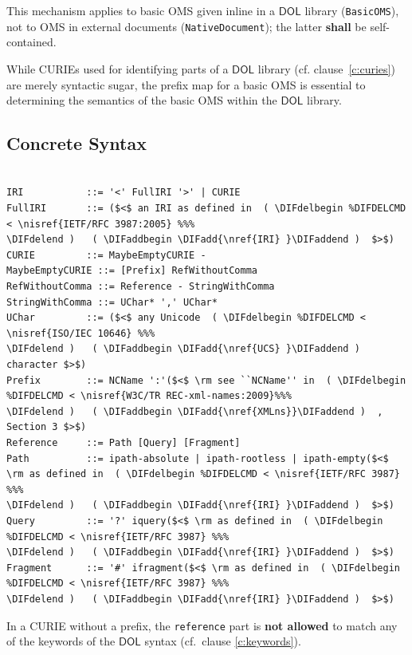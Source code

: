 \documentclass[10pt,fleqn,final]{scrreprt}
\makeatletter
\newcommand*{\cf}{cf.\@\xspace}
\newcommand*{\syntax}[1]{\texttt{#1}}
\newcommand*{\notallowed}{\textbf{not allowed}\xspace}
\newcommand*{\shall}{\textbf{shall}\xspace}
\newcommand*{\DOL}{\ensuremath{\mathsf{DOL}}\xspace}
\newcommand{\clauserefname}{clause}
\newcommand{\noterefname}{note}
\newcommand{\cref}[1]{\clauserefname~\ref{#1}}
\newcommand{\nref}[1]{\noterefname~\ref{#1}}
\newcommand{\ssclause}[1]{\subsection{#1}}
\renewcommand{\nref}[1]{\ref{nref-#1}} %
\providecommand{\DIFadd}[1]{{\protect\color{blue}\uwave{#1}}} %
\providecommand{\DIFaddbegin}{} %
\providecommand{\DIFaddend}{} %
\providecommand{\DIFdelbegin}{} %
\providecommand{\DIFdelend}{} %
\makeatother
\begin{document}
This mechanism applies to basic OMS given inline in a \DOL library (\syntax{BasicOMS}), not to OMS in external documents (\syntax{NativeDocument}); the latter \shall be self-contained.

While CURIEs used for identifying parts of a \DOL library (\cf \cref{c:curies}) are merely syntactic 
sugar, the prefix map for a basic OMS is essential to determining the semantics of the basic OMS 
within the \DOL library. 




\ssclause{Concrete Syntax}\DIFaddbegin \label{c:curie-syntax}
\DIFaddend 

\vspace{-1.4em}
\begin{lstlisting}[language=ebnf,escapeinside={()}]

IRI           ::= '<' FullIRI '>' | CURIE
FullIRI       ::= ($<$ an IRI as defined in  ( \DIFdelbegin %DIFDELCMD < \nisref{IETF/RFC 3987:2005} %%%
\DIFdelend )   ( \DIFaddbegin \DIFadd{\nref{IRI} }\DIFaddend )  $>$) 
CURIE         ::= MaybeEmptyCURIE -
MaybeEmptyCURIE ::= [Prefix] RefWithoutComma
RefWithoutComma ::= Reference - StringWithComma
StringWithComma ::= UChar* ',' UChar*
UChar         ::= ($<$ any Unicode  ( \DIFdelbegin %DIFDELCMD < \nisref{ISO/IEC 10646} %%%
\DIFdelend )   ( \DIFaddbegin \DIFadd{\nref{UCS} }\DIFaddend )  character $>$) 
Prefix        ::= NCName ':'($<$ \rm see ``NCName'' in  ( \DIFdelbegin %DIFDELCMD < \nisref{W3C/TR REC-xml-names:2009}%%%
\DIFdelend )   ( \DIFaddbegin \DIFadd{\nref{XMLns}}\DIFaddend )  , Section 3 $>$)
Reference     ::= Path [Query] [Fragment]
Path          ::= ipath-absolute | ipath-rootless | ipath-empty($<$ \rm as defined in  ( \DIFdelbegin %DIFDELCMD < \nisref{IETF/RFC 3987} %%%
\DIFdelend )   ( \DIFaddbegin \DIFadd{\nref{IRI} }\DIFaddend )  $>$)
Query         ::= '?' iquery($<$ \rm as defined in  ( \DIFdelbegin %DIFDELCMD < \nisref{IETF/RFC 3987} %%%
\DIFdelend )   ( \DIFaddbegin \DIFadd{\nref{IRI} }\DIFaddend )  $>$)
Fragment      ::= '#' ifragment($<$ \rm as defined in  ( \DIFdelbegin %DIFDELCMD < \nisref{IETF/RFC 3987} %%%
\DIFdelend )   ( \DIFaddbegin \DIFadd{\nref{IRI} }\DIFaddend )  $>$)
\end{lstlisting}


In a CURIE without a prefix, the \syntax{reference} part is \notallowed to match any of the keywords of the \DOL syntax (cf.\ clause \ref{c:keywords}).

\medspace
\end{document}
